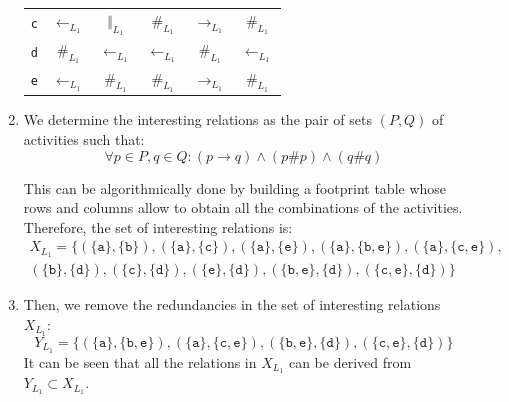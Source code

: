 \begin{description}
\begin{example}
\begin{enumerate}
\begin{center}
\begin{tabular}{c | c c c c c}
                            \texttt{c}  & $\leftarrow_{L_1}$    & $\Vert_{L_1}$         & $\#_{L_1}$            & $\rightarrow_{L_1}$   & $\#_{L_1}$ \\
                            \texttt{d}  & $\#_{L_1}$            & $\leftarrow_{L_1}$    & $\leftarrow_{L_1}$    & $\#_{L_1}$            & $\leftarrow_{L_1}$ \\
                            \texttt{e}  & $\leftarrow_{L_1}$    & $\#_{L_1}$            & $\#_{L_1}$            & $\rightarrow_{L_1}$   & $\#_{L_1}$ \\
                        \end{tabular}
                    \end{center}

                \item We determine the interesting relations as the pair of sets $(P, Q)$ of activities such that:
                    \[ \forall p \in P, q \in Q: (p \rightarrow q) \land (p \# p) \land (q \# q) \]
                    
                    This can be algorithmically done by building a footprint table whose rows and columns allow to obtain all the combinations of the activities.
                    Therefore, the set of interesting relations is:
                    \[
                        \begin{split}
                            X_{L_1} = \{ 
                                (\{\texttt{a}\}, \{\texttt{b}\}), (\{\texttt{a}\}, \{\texttt{c}\}), (\{\texttt{a}\}, \{\texttt{e}\}), 
                                (\{\texttt{a}\}, \{\texttt{b}, \texttt{e}\}), (\{\texttt{a}\}, \{\texttt{c}, \texttt{e}\}), \\
                                (\{\texttt{b}\}, \{\texttt{d}\}), (\{\texttt{c}\}, \{\texttt{d}\}), (\{\texttt{e}\}, \{\texttt{d}\}), 
                                (\{\texttt{b}, \texttt{e}\}, \{\texttt{d}\}), (\{\texttt{c}, \texttt{e}\}, \{\texttt{d}\}) 
                            \} 
                        \end{split}
                    \]

                \item Then, we remove the redundancies in the set of interesting relations $X_{L_1}$:
                    \[ Y_{L_1} = \{ (\{\texttt{a}\}, \{\texttt{b}, \texttt{e}\}), (\{\texttt{a}\}, \{\texttt{c}, \texttt{e}\}),
                        (\{\texttt{b}, \texttt{e}\}, \{\texttt{d}\}), (\{\texttt{c}, \texttt{e}\}, \{\texttt{d}\}) \} \]
                    It can be seen that all the relations in $X_{L_1}$ can be derived from $Y_{L_1} \subset X_{L_1}$.
                

\end{enumerate}
\end{example}
\end{description}
